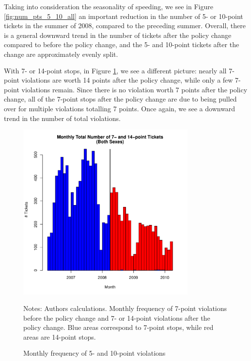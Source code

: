 Taking into consideration the seasonality of speeding, we see 
in Figure \ref{fig:num_pts_5_10_all}
an important reduction in the number of 5- or 10-point tickets 
in the summer of 2008, compared to the preceding summer. 
Overall, there is a general downward trend in the number of tickets 
after the policy change compared to before the policy change, 
and the 5- and 10-point tickets after the change are approximately evenly split. 

With 7- or 14-point stops,
in Figure \ref{fig:num_pts_7_14_all}, 
we see a different picture: 
nearly all 7-point violations are worth 14 points after the policy change, 
while only a few 7-point violations remain. 
Since there is no violation worth 7 points after the policy change, 
all of the 7-point stops after the policy change are due to being pulled over 
for multiple violations totalling 7 points. 
Once again, we see a downward trend in the number of total violations. %



\begin{figure}
\centering
\includegraphics[width=0.8\textwidth]{../Figures/num_pts_7_14_all_orig.pdf}
\caption{Monthly frequency of 5- and 10-point violations }
Notes: Authors calculations. 
Monthly frequency of 7-point violations before the policy change 
and 7- or 14-point violations after the policy change. 
Blue areas correspond to 7-point stops, while red areas are 14-point stops.
\label{fig:num_pts_7_14_all}
\end{figure}


